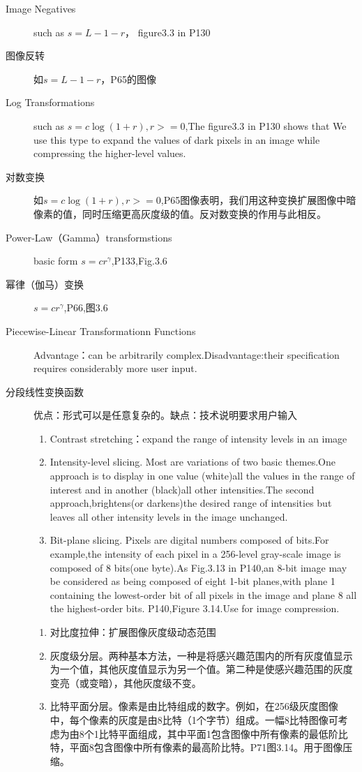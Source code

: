 \documentclass[12pt]{article}
\numberwithin{equation}{section}%
\begin{document}
\begin{description}
\item[Image Negatives]such as $s=L-1-r$， figure3.3 in P130

\item[图像反转]如$s=L-1-r$，P65的图像

\item[Log Transformations]such as $s=c\log(1+r),r>=0$,The figure3.3 in P130 shows that We use this type to expand the values of dark pixels in an image  while compressing the higher-level values.

\item[对数变换]如$s=c\log(1+r),r>=0$,P65图像表明，我们用这种变换扩展图像中暗像素的值，同时压缩更高灰度级的值。反对数变换的作用与此相反。
\item[Power-Law（Gamma）transformstions]basic form $s=cr^\gamma$,P133,Fig.3.6

\item[幂律（伽马）变换]$s=cr^\gamma$,P66,图3.6

\item[Piecewise-Linear Transformationn Functions]Advantage：can be arbitrarily complex.\quad Disadvantage:their specification requires considerably more user input.

\item[分段线性变换函数]优点：形式可以是任意复杂的。\quad 缺点：技术说明要求用户输入

 \begin{enumerate}
 \item Contrast stretching：expand the range of intensity levels in an image
 \item Intensity-level slicing. Most are variations of two basic themes.One approach is to display in one value (white)all the values in the range of interest and in another (black)all other intensities.The second approach,brightens(or darkens)the desired range of intensities but leaves all other intensity levels in the image unchanged.  
\item Bit-plane slicing. Pixels are digital numbers composed of bits.For example,the intensity of each pixel in a 256-level gray-scale image is composed of 8 bits(one byte).As Fig.3.13 in P140,an 8-bit image may be considered as being composed of eight 1-bit planes,with plane 1 containing the lowest-order bit of all pixels in the image and plane 8 all the highest-order bits. P140,Figure 3.14.Use for image compression.

 \end{enumerate}
 \begin{enumerate}
 \item 对比度拉伸：扩展图像灰度级动态范围
 \item 灰度级分层。两种基本方法，一种是将感兴趣范围内的所有灰度值显示为一个值，其他灰度值显示为另一个值。第二种是使感兴趣范围的灰度变亮（或变暗），其他灰度级不变。
\item 比特平面分层。像素是由比特组成的数字。例如，在256级灰度图像中，每个像素的灰度是由8比特（1个字节）组成。一幅8比特图像可考虑为由8个1比特平面组成，其中平面1包含图像中所有像素的最低阶比特，平面8包含图像中所有像素的最高阶比特。P71图3.14。用于图像压缩。
 \end{enumerate}
\end{description}
\end{document}
